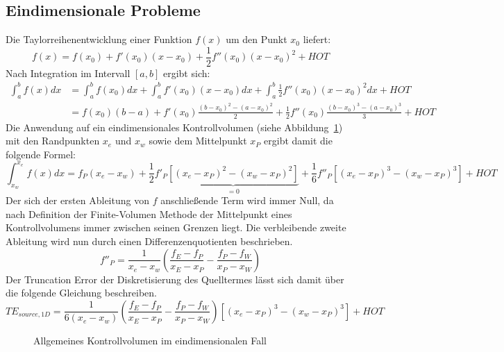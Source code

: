 \subsection{Eindimensionale Probleme}
\label{sec:source1d}
Die Taylorreihenentwicklung einer Funktion $f(x)$ um den Punkt $x_0$
liefert:
\begin{equation*}
  f(x) = f(x_0) + f'(x_0)(x-x_0) + \frac{1}{2} f''(x_0)(x-x_0)^2 + HOT
\end{equation*}
Nach Integration im Intervall $[a, b]$ ergibt sich:
\begin{align*}
  \int_a^b f(x) dx &= \int_a^b f(x_0) dx + \int_a^b f'(x_0)(x-x_0) dx
+ \int_a^b \frac{1}{2} f''(x_0)(x-x_0)^2 dx + HOT\\
&= f(x_0) (b-a) + f'(x_0) \frac{(b-x_0)^2-(a-x_0)^2}{2}
+ \frac{1}{2} f''(x_0) \frac{(b-x_0)^3-(a-x_0)^3}{3} +HOT
\end{align*}
Die Anwendung auf ein eindimensionales Kontrollvolumen (siehe Abbildung~\ref{fig:kv1d}) mit den Randpunkten $x_e$ und
$x_w$ sowie dem Mittelpunkt $x_P$ ergibt damit die folgende Formel:
\begin{equation*}
  \int_{x_w}^{x_e} f(x)dx = f_P(x_e-x_w)
  + \frac{1}{2} f'_P \underbrace{\left[{(x_e-x_P)^2-(x_w-x_P)^2}\right]}_{=0}
+ \frac{1}{6} f''_P \left[{{(x_e-x_P)}^3-{(x_w-x_P)}^3}\right] + HOT
\end{equation*}
Der sich der ersten Ableitung von $f$ anschließende Term wird immer Null, da nach
Definition der Finite-Volumen Methode der Mittelpunkt eines Kontrollvolumens immer
zwischen seinen Grenzen liegt.
Die verbleibende zweite Ableitung wird nun durch einen Differenzenquotienten
beschrieben.
\begin{equation}
  \label{eq:diskretisierung_f''P}
  f''_P = \frac{1}{x_e-x_w}\left(\frac{f_E-f_P}{x_E-x_P}-\frac{f_P-f_W}{x_P-x_W}\right)
\end{equation}
Der Truncation Error der Diskretisierung des Quelltermes lässt sich damit über die
folgende Gleichung beschreiben.
\begin{equation}
  TE_{source,1D} =
\frac{1}{6(x_e-x_w)}\left(\frac{f_E-f_P}{x_E-x_P}-\frac{f_P-f_W}{x_P-x_W}\right)
\left[{{(x_e-x_P)}^3-{(x_w-x_P)}^3}\right] + HOT\label{eq:te_source1}
\end{equation}

\begin{figure}[bt]

\centering
\caption{Allgemeines Kontrollvolumen im eindimensionalen Fall}
\label{fig:kv1d}
\end{figure}

